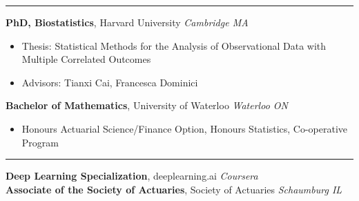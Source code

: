 \documentclass[10pt,english]{report}
\begin{document}
\vspace{5mm}

{}
\vspace{1mm}\hrule
\vspace{1mm}

\textbf{PhD, Biostatistics}, Harvard University \hfill \textit{Cambridge MA} \texttt{}
\begin{itemize}
\item Thesis: Statistical Methods for the Analysis of Observational Data with Multiple Correlated Outcomes
\item Advisors: Tianxi Cai, Francesca Dominici
\end{itemize}

\vspace{1mm}

\textbf{Bachelor of Mathematics}, University of Waterloo \hfill \textit{Waterloo ON} \texttt{}
\begin{itemize}
\item Honours Actuarial Science/Finance Option, Honours Statistics, Co-operative
Program
\end{itemize}

\vspace{1mm}
\vspace{1mm}\hrule
\vspace{1mm}

\textbf{Deep Learning Specialization}, deeplearning.ai \hfill \textit{Coursera} \texttt{} \\
\textbf{Associate of the Society of Actuaries}, Society of Actuaries \hfill \textit{Schaumburg IL} \texttt{}
\end{document}
